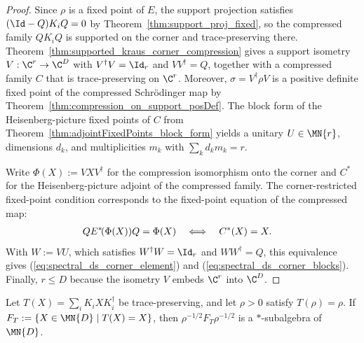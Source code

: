 \begin{proof}
    \leanok
    Since $\rho$ is a fixed point of $E$, the support projection satisfies
    $(\Id-Q)K_iQ=0$ by Theorem~\ref{thm:support_proj_fixed}, so the
    compressed family $QK_iQ$ is supported on the corner and
    trace-preserving there. Theorem~\ref{thm:supported_kraus_corner_compression}
    gives a support isometry $V:\C^r\to\C^D$ with
    $V^\dagger V=\Id_r$ and $VV^\dagger=Q$, together with a compressed family
    $C$ that is trace-preserving on $\C^r$. Moreover,
    $\sigma=V^\dagger\rho V$ is a positive definite fixed point of the
    compressed Schr\"odinger map by
    Theorem~\ref{thm:compression_on_support_posDef}. The block form of the
    Heisenberg-picture fixed points of $C$ from
    Theorem~\ref{thm:adjointFixedPoints_block_form} yields a unitary
    $U\in\MN{r}$, dimensions $d_k$, and multiplicities $m_k$ with
    $\sum_kd_km_k=r$.

    Write $\Phi(X):=VXV^\dagger$ for the compression isomorphism onto the
    corner and $C^*$ for the Heisenberg-picture adjoint of the compressed
    family. The corner-restricted fixed-point condition corresponds to the
    fixed-point equation of the compressed map:
    \begin{align}
        QE^*\!(\Phi(X))Q=\Phi(X)
         & \quad\Longleftrightarrow\quad C^*(X)=X.
        \notag
    \end{align}
    With $W:=VU$, which satisfies $W^\dagger W=\Id_r$ and
    $WW^\dagger=Q$, this equivalence gives
    (\ref{eq:spectral_ds_corner_element}) and
    (\ref{eq:spectral_ds_corner_blocks}). Finally, $r\leq D$ because the
    isometry $V$ embeds $\C^r$ into $\C^D$.
\end{proof}

\begin{theorem}%
    \label{thm:weightedFixedPointsStarSubalgebra}
    \leanok
    Let $T(X)=\sum_iK_iXK_i^\dagger$ be trace-preserving, and let
    $\rho>0$ satisfy $T(\rho)=\rho$. If
    $F_T:=\{X\in\MN{D}\mid T(X)=X\}$, then
    $\rho^{-1/2}F_T\rho^{-1/2}$ is a $*$-subalgebra of $\MN{D}$.
\end{theorem}

